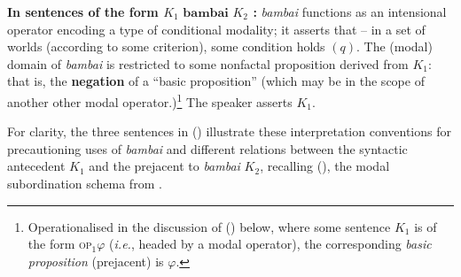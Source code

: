 \pex[labelformat=\bf\it A]\textbf{In sentences of the form $ \boldsymbol{\mathit{K_1} \textbf{ bambai }\mathit{K_2} } $ :}
\a \textit{bambai} functions as an intensional operator encoding a type of conditional modality; it asserts that -- in a set of worlds (according to some criterion), some condition holds $ (q) $. 
\a The (modal) domain of \textit{bambai} is restricted to some nonfactal proposition derived from $ \mathit{K_1}  $: that is, the \textbf{negation} of a ``basic proposition'' (which may be in the scope of another other modal operator.)\footnote{Operationalised in the discussion of () below, where some sentence $ \mathit{K_1} $ is of the form \textsc{op}$_1 \varphi $ (\textit{i.e.}, headed by a modal operator), the corresponding \textit{basic proposition} (prejacent) is $ \varphi $.} 
\a The speaker asserts $ \mathit{K_1} $.%
\xe


\noindent For clarity, the three sentences in () illustrate these interpretation conventions for precautioning uses of \textit{bambai} and different relations between the syntactic antecedent $ \mathit{K_1} $ and the prejacent to \textit{bambai} $ \mathit{K_2} $, recalling (), the modal subordination schema from \citet{Roberts2020}.

